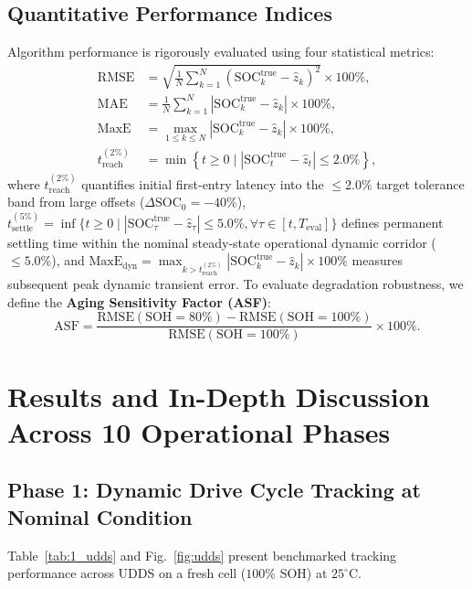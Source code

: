 \documentclass[balance,nocopyright,upint,varvw,hyphenate,barcolor=NavyBlue,nolists]{asmejour}
\begin{document}
\subsection{Quantitative Performance Indices}
Algorithm performance is rigorously evaluated using four statistical metrics:
\begin{align}
\text{RMSE} &= \sqrt{\tfrac{1}{N}\textstyle\sum_{k=1}^N (\text{SOC}_k^{\text{true}} - \hat{z}_k)^2} \times 100\%, \label{eqn:rmse}\\
\text{MAE} &= \tfrac{1}{N}\textstyle\sum_{k=1}^N |\text{SOC}_k^{\text{true}} - \hat{z}_k| \times 100\%, \label{eqn:mae}\\
\text{MaxE} &= \max_{1 \le k \le N} |\text{SOC}_k^{\text{true}} - \hat{z}_k| \times 100\%, \label{eqn:maxe}\\
t_{\text{reach}}^{(2\%)} &= \min\left\{ t \ge 0 \mid |\text{SOC}_t^{\text{true}} - \hat{z}_t| \le 2.0\% \right\}, \label{eqn:treach}
\end{align}
where $t_{\text{reach}}^{(2\%)}$ quantifies initial first-entry latency into the $\le 2.0\%$ target tolerance band from large offsets ($\Delta\text{SOC}_0 = -40\%$), $t_{\text{settle}}^{(5\%)} = \inf\{ t \ge 0 \mid |\text{SOC}_\tau^{\text{true}} - \hat{z}_\tau| \le 5.0\%, \forall \tau \in [t, T_{\text{eval}}] \}$ defines permanent settling time within the nominal steady-state operational dynamic corridor ($\le 5.0\%$), and $\text{MaxE}_{\text{dyn}} = \max_{k > t_{\text{reach}}^{(2\%)}} |\text{SOC}_k^{\text{true}} - \hat{z}_k| \times 100\%$ measures subsequent peak dynamic transient error.
To evaluate degradation robustness, we define the \textbf{Aging Sensitivity Factor (ASF)}:
\begin{equation}\label{eqn:asf}
\text{ASF} = \frac{\text{RMSE}(\text{SOH}=80\%) - \text{RMSE}(\text{SOH}=100\%)}{\text{RMSE}(\text{SOH}=100\%)} \times 100\%.
\end{equation}

\section{Results and In-Depth Discussion Across 10 Operational Phases}

\subsection{Phase 1: Dynamic Drive Cycle Tracking at Nominal Condition}
Table~\ref{tab:1_udds} and Fig.~\ref{fig:udds} present benchmarked tracking performance across UDDS on a fresh cell ($100\%$ SOH) at $25^\circ\text{C}$.
\end{document}
